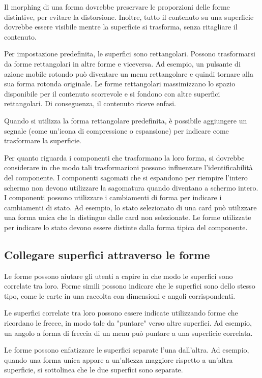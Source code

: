 \documentclass[12pt, a4paper]{report}
\begin{document}
	Il morphing di una forma dovrebbe preservare le proporzioni delle forme distintive, per evitare la distorsione.
	Inoltre, tutto il contenuto su una superficie dovrebbe essere visibile mentre la superficie si trasforma, senza ritagliare il contenuto.

	Per impostazione predefinita, le superfici sono rettangolari. Possono trasformarsi da forme rettangolari in altre forme e viceversa. Ad esempio, un pulsante di azione mobile rotondo
	può diventare un menu rettangolare e quindi tornare alla sua forma rotonda originale. Le forme rettangolari massimizzano lo spazio disponibile per il contenuto scorrevole e si fondono con altre superfici rettangolari. Di conseguenza, il contenuto riceve enfasi.

	Quando si utilizza la forma rettangolare predefinita, è possibile aggiungere un segnale (come un'icona di compressione o espansione) per indicare come trasformare la superficie.

	Per quanto riguarda i componenti che trasformano la loro forma, si dovrebbe considerare in che modo tali trasformazioni possono influenzare l'identificabilità del componente. I componenti sagomati che si espandono per riempire l'intero schermo non devono utilizzare la sagomatura quando diventano a schermo intero.
	I componenti possono utilizzare i cambiamenti di forma per indicare i cambiamenti di stato. Ad esempio, lo stato selezionato di una card può utilizzare una forma unica che la distingue dalle card non selezionate. Le forme utilizzate per indicare lo stato devono essere distinte dalla forma tipica del componente.

	\subsection{Collegare superfici attraverso le forme}
	Le forme possono aiutare gli utenti a capire in che modo le superfici sono correlate tra loro.
	Forme simili possono indicare che le superfici sono dello stesso tipo, come le carte in una raccolta con dimensioni e angoli corrispondenti.

	Le superfici correlate tra loro possono essere indicate utilizzando forme che ricordano le frecce, in modo tale da "puntare" verso altre superfici. Ad esempio, un angolo a forma di freccia di un menu può puntare a una superficie correlata.


	Le forme possono enfatizzare le superfici separate l'una dall'altra. Ad esempio, quando una forma unica appare a un'altezza maggiore rispetto a un'altra superficie, si sottolinea che le due superfici sono separate.
\end{document}
